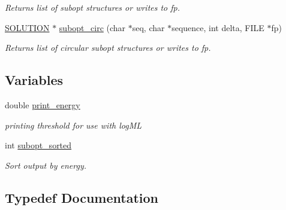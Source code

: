 \begin{DoxyCompactItemize}
\begin{DoxyCompactList}\small\item\em Returns list of subopt structures or writes to fp. \end{DoxyCompactList}\item 
\mbox{\hyperlink{subopt_8h_aa0f46ff02e1017469cf902d02ecd7f9a}{S\+O\+L\+U\+T\+I\+ON}} $\ast$ \mbox{\hyperlink{group__subopt__wuchty_ga8634516e4740e0b6c9a46d2bae940340}{subopt\+\_\+circ}} (char $\ast$seq, char $\ast$sequence, int delta, F\+I\+LE $\ast$fp)
\begin{DoxyCompactList}\small\item\em Returns list of circular subopt structures or writes to fp. \end{DoxyCompactList}\end{DoxyCompactItemize}
\subsection*{Variables}
\begin{DoxyCompactItemize}
\item 
\mbox{\label{group__subopt__wuchty_ga5e57d914bcb5feeecdf520e25313fcfe}} 
double \mbox{\hyperlink{group__subopt__wuchty_ga5e57d914bcb5feeecdf520e25313fcfe}{print\+\_\+energy}}
\begin{DoxyCompactList}\small\item\em printing threshold for use with log\+ML \end{DoxyCompactList}\item 
\mbox{\label{group__subopt__wuchty_ga873cf8ed69e0437f8efa8b1fec854a0e}} 
int \mbox{\hyperlink{group__subopt__wuchty_ga873cf8ed69e0437f8efa8b1fec854a0e}{subopt\+\_\+sorted}}
\begin{DoxyCompactList}\small\item\em Sort output by energy. \end{DoxyCompactList}\end{DoxyCompactItemize}


\subsection{Typedef Documentation}
\mbox{\label{group__subopt__wuchty_gaa0270c66d04f59e750401695b8282e04}} 
